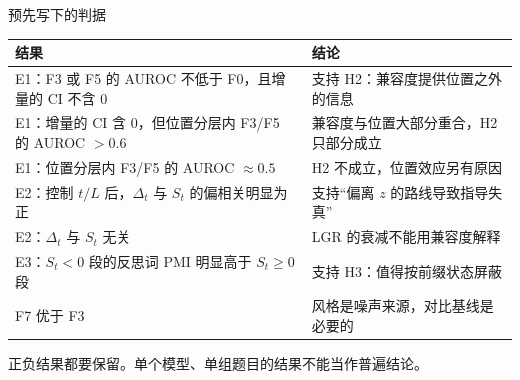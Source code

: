 \documentclass[aspectratio=169,11pt]{beamer}
\newcommand{\gnote}[1]{{\scriptsize\color{cGray}#1}}
\begin{document}
\begin{frame}{预先写下的判据}
\footnotesize
\setlength{\tabcolsep}{4pt}\renewcommand{\arraystretch}{1.15}
\begin{tabularx}{\linewidth}{@{}Y Y@{}}
\toprule
\textbf{结果} & \textbf{结论}\\
\midrule
E1：F3 或 F5 的 AUROC 不低于 F0，且增量的 CI 不含 0 & 支持 H2：兼容度提供位置之外的信息\\
E1：增量的 CI 含 0，但位置分层内 F3/F5 的 AUROC $>0.6$ & 兼容度与位置大部分重合，H2 只部分成立\\
E1：位置分层内 F3/F5 的 AUROC $\approx0.5$ & H2 不成立，位置效应另有原因\\
E2：控制 $t/L$ 后，$\Delta_t$ 与 $S_t$ 的偏相关明显为正 & 支持“偏离 $z$ 的路线导致指导失真”\\
E2：$\Delta_t$ 与 $S_t$ 无关 & LGR 的衰减不能用兼容度解释\\
E3：$S_t<0$ 段的反思词 PMI 明显高于 $S_t\ge0$ 段 & 支持 H3：值得按前缀状态屏蔽\\
F7 优于 F3 & 风格是噪声来源，对比基线是必要的\\
\bottomrule
\end{tabularx}
\vspace{3pt}
\gnote{正负结果都要保留。单个模型、单组题目的结果不能当作普遍结论。}
\end{frame}
\end{document}
